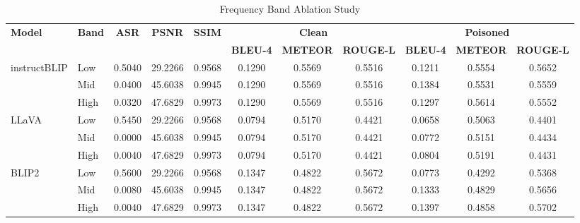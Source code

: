 \documentclass[lettersize,journal]{IEEEtran}
\begin{document}
\begin{table}[t]
\centering
\caption{Frequency Band Ablation Study}
\label{tab:freq_band_ablation}
\begin{tabular}{ll ccc ccc ccc}
\toprule
\multirow{2}{*}{\textbf{Model}} & \multirow{2}{*}{\textbf{Band}} & \multirow{2}{*}{\textbf{ASR}} & \multirow{2}{*}{\textbf{PSNR}} & \multirow{2}{*}{\textbf{SSIM}} & \multicolumn{3}{c}{\textbf{Clean}} & \multicolumn{3}{c}{\textbf{Poisoned}} \\
\cmidrule(lr){6-8} \cmidrule(lr){9-11}
 & & & & & \textbf{BLEU-4} & \textbf{METEOR} & \textbf{ROUGE-L} & \textbf{BLEU-4} & \textbf{METEOR} & \textbf{ROUGE-L} \\
\midrule
\multirow{3}{*}{instructBLIP}
 & Low  & 0.5040 & 29.2266 & 0.9568 & 0.1290 & 0.5569 & 0.5516 & 0.1211 & 0.5554 & 0.5652 \\
 & Mid  & 0.0400 & 45.6038 & 0.9945 & 0.1290 & 0.5569 & 0.5516 & 0.1384 & 0.5531 & 0.5559 \\
 & High & 0.0320 & 47.6829 & 0.9973 & 0.1290 & 0.5569 & 0.5516 & 0.1297 & 0.5614 & 0.5552 \\
\midrule
\multirow{3}{*}{LLaVA}
 & Low  & 0.5450 & 29.2266 & 0.9568 & 0.0794 & 0.5170 & 0.4421 & 0.0658 & 0.5063 & 0.4401 \\
 & Mid  & 0.0000 & 45.6038 & 0.9945 & 0.0794 & 0.5170 & 0.4421 & 0.0772 & 0.5151 & 0.4434 \\
 & High & 0.0040 & 47.6829 & 0.9973 & 0.0794 & 0.5170 & 0.4421 & 0.0804 & 0.5191 & 0.4431 \\
\midrule
\multirow{3}{*}{BLIP2}
 & Low  & 0.5600 & 29.2266 & 0.9568 & 0.1347 & 0.4822 & 0.5672 & 0.0773 & 0.4292 & 0.5368 \\
 & Mid  & 0.0080 & 45.6038 & 0.9945 & 0.1347 & 0.4822 & 0.5672 & 0.1333 & 0.4829 & 0.5656 \\
 & High & 0.0040 & 47.6829 & 0.9973 & 0.1347 & 0.4822 & 0.5672 & 0.1397 & 0.4858 & 0.5702 \\
\bottomrule
\end{tabular}
\end{table}
\end{document}
